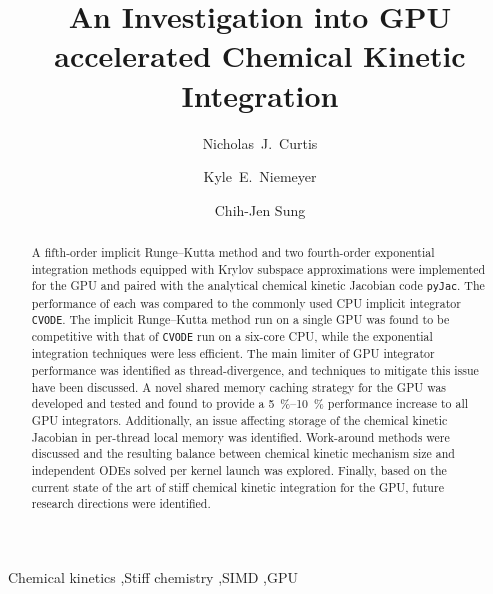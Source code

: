 \documentclass[preprint]{elsarticle}
\begin{document}
\begin{frontmatter}

\title{An Investigation into GPU accelerated Chemical Kinetic Integration}

\author[uconn]{Nicholas~J.\ Curtis}
\author[osu]{Kyle~E.\ Niemeyer}
\author[uconn]{Chih-Jen Sung}

\address[uconn]{Department of Mechanical Engineering\\
  University of Connecticut, Storrs, CT, 06269, USA}
\address[osu]{School of Mechanical, Industrial, and Manufacturing Engineering\\
  Oregon State University, Corvallis, OR 97331, USA}
  

\begin{abstract}
A fifth-order implicit Runge--Kutta method and two fourth-order exponential integration methods equipped with Krylov subspace approximations were implemented for the GPU and paired with the analytical chemical kinetic Jacobian code \texttt{pyJac}.
The performance of each was compared to the commonly used CPU implicit integrator \texttt{CVODE}.
The implicit Runge--Kutta method run on a single GPU was found to be competitive with that of \texttt{CVODE} run on a six-core CPU, while the exponential integration techniques were less efficient.
The main limiter of GPU integrator performance was identified as thread-divergence, and techniques to mitigate this issue have been discussed.
A novel shared memory caching strategy for the GPU was developed and tested and found to provide a \SIrange{5}{10}{\percent} performance increase to all GPU integrators.
Additionally, an issue affecting storage of the chemical kinetic Jacobian in per-thread local memory was identified.
Work-around methods were discussed and the resulting balance between chemical kinetic mechanism size and independent ODEs solved per kernel launch was explored.
Finally, based on the current state of the art of stiff chemical kinetic integration for the GPU, future research directions were identified.
\end{abstract}

\begin{keyword}
 Chemical kinetics \sep Stiff chemistry \sep SIMD \sep GPU
\end{keyword}

\end{frontmatter}
\pagebreak
\end{document}
